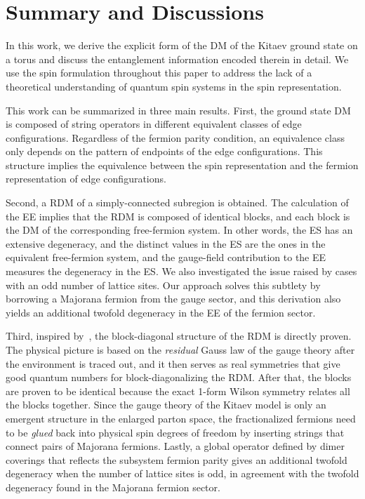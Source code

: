 \section{Summary and Discussions}\label{sec:summary}

In this work, we derive the explicit form of the DM of the Kitaev ground state on a torus and discuss the entanglement information encoded therein in detail. We use the spin formulation throughout this paper to address the lack of a theoretical understanding of quantum spin systems in the spin representation.

This work can be summarized in three main results. First, the ground state DM is composed of string operators in different equivalent classes of edge configurations. 
Regardless of the fermion parity condition, an equivalence class only depends on the pattern of endpoints of the edge configurations. This structure implies the equivalence between the spin representation and the fermion representation of edge configurations. 

Second, a RDM of a simply-connected subregion is obtained. The calculation of the EE implies that the RDM is composed of identical blocks, and each block is the DM of the corresponding free-fermion system. In other words, the ES has an extensive degeneracy, and the distinct values in the ES are the ones in the equivalent free-fermion system, and the gauge-field contribution to the EE measures the degeneracy in the ES. We also investigated the issue raised by cases with an odd number of lattice sites. Our approach solves this subtlety by borrowing a Majorana fermion from the gauge sector, and this derivation also yields {an additional twofold degeneracy in the EE of the fermion sector}.

Third, inspired by~\cite{Xu-Rakovszky-Knap-Pollmann_2025}, the block-diagonal structure of the RDM is directly proven. The physical picture is based on the \textit{residual} Gauss law of the gauge theory after the environment is traced out, and it then serves as real symmetries that give good quantum numbers for block-diagonalizing the RDM. After that, the blocks are proven to be identical because the exact 1-form Wilson symmetry relates all the blocks together. Since the gauge theory of the Kitaev model is only an emergent structure in the enlarged parton space, the fractionalized fermions need to be \textit{glued} back into physical spin degrees of freedom by inserting strings that connect pairs of Majorana fermions. Lastly, a global operator defined by dimer coverings that reflects the subsystem fermion parity gives an additional twofold degeneracy when the number of lattice sites is odd, in agreement with the twofold degeneracy found in the Majorana fermion sector.

